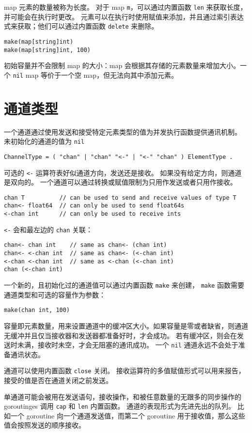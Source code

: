 map 元素的数量被称为长度。
对于 map \lstinline|m|，可以通过内置函数 \lstinline|len| 来获取长度，并可能会在执行时更改。
元素可以在执行时使用赋值来添加，并且通过索引表达式来获取；他们可以通过内置函数 \lstinline|delete| 来删除。
\begin{lstlisting}[style=golang]
make(map[string]int)
make(map[string]int, 100)
\end{lstlisting}
初始容量并不会限制 map 的大小：map 会根据其存储的元素数量来增加大小。一个 \lstinline|nil| map
等价于一个空 map，但无法向其中添加元素。

\section{通道类型}
一个通道通过使用发送和接受特定元素类型的值为并发执行函数提供通讯机制。
未初始化的通道的值为 \lstinline|nil|
\begin{lstlisting}[style=EBNF]
ChannelType = ( "chan" | "chan" "<-" | "<-" "chan" ) ElementType .
\end{lstlisting}

可选的 \lstinline|<-| 运算符表好似通道方向，发送还是接收。
如果没有给定方向，则通道是双向的。
一个通道可以通过转换或赋值限制为只用作发送或者只用作接收。
\begin{lstlisting}[style=golang]
chan T          // can be used to send and receive values of type T
chan<- float64  // can only be used to send float64s
<-chan int      // can only be used to receive ints
\end{lstlisting}

\lstinline|<-| 会和最左边的 \lstinline|chan| 关联：
\begin{lstlisting}[style=golang]
chan<- chan int    // same as chan<- (chan int)
chan<- <-chan int  // same as chan<- (<-chan int)
<-chan <-chan int  // same as <-chan (<-chan int)
chan (<-chan int)
\end{lstlisting}

一个新的，且初始化过的通道值可以通过内置函数 \lstinline|make| 来创建，
\lstinline|make| 函数需要通道类型和可选的容量作为参数：
\begin{lstlisting}[style=golang]
make(chan int, 100)
\end{lstlisting}

容量即元素数量，用来设置通道中的缓冲区大小。如果容量是零或者缺省，则通道无缓冲并且仅当接收器和发送器都准备好时，才会成功。
若有缓冲区，则会在发送时未满，接收时未空，才会无阻塞的通讯成功。
一个 \lstinline|nil| 通道永远不会处于准备通讯状态。

通道可以使用内置函数 \lstinline|close| 关闭。
接收运算符的多值赋值形式可以用来报告，接受的值是否在通道关闭之前发送。

单通道可能会被用在发送语句，接收操作，和被任意数量的无跟多的同步操作的 goroutinges 调用 \lstinline|cap| 和 \lstinline|len| 内置函数。
通道的表现形式为先进先出的队列。
比如一个 goroutine 向一个通道发送值，而第二个 goroutine 用于接收值，那么这些值会按照发送的顺序接收。




